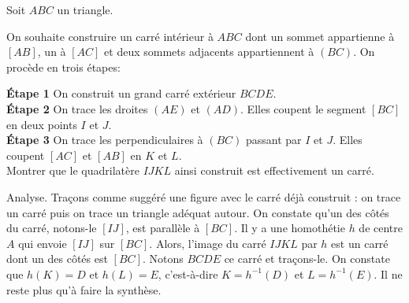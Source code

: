 \begin{exo}
Soit $ABC$ un triangle.
\begin{multicols}{2}

On souhaite construire un carré intérieur à $ABC$ dont un sommet appartienne à $[AB]$, un à $[AC]$ et deux sommets adjacents appartiennent à $(BC)$. On procède en trois étapes:

\noindent\textbf{Étape 1} On construit un grand carré extérieur $BCDE$.\\
\textbf{Étape 2}  On  trace les droites $(AE)$ et $(AD)$. Elles  coupent le segment $[BC]$ en deux points $I$ et $J$.\\
\textbf{Étape 3}  On trace les perpendiculaires à $(BC)$ passant par $I$ et $J$. Elles coupent $[AC]$ et $[AB]$ en $K$ et $L$.\\

Montrer que le quadrilatère $IJKL$ ainsi construit est effectivement un carré.
\begin{center}
\end{center}
\end{multicols}
\begin{hint}   

\end{hint}      
\begin{sol} 

Analyse. Traçons comme suggéré une figure avec le carré déjà construit : on trace un carré puis on trace un triangle adéquat autour. On constate qu'un des côtés du carré, notons-le $[IJ]$, est parallèle à $[BC]$. Il y a une homothétie $h$ de centre $A$ qui envoie $[IJ]$ sur $[BC]$. Alors, l'image du carré $IJKL$ par $h$ est un carré dont un des côtés est $[BC]$. Notons $BCDE$ ce carré et traçons-le. On constate que $h(K)=D$ et $h(L)=E$, c'est-à-dire $K=h^{-1}(D)$ et $L = h^{-1}(E)$. Il ne reste plus qu'à faire la synthèse.


\end{sol}  
\end{exo}  



